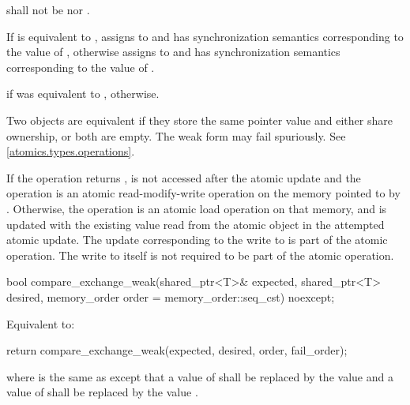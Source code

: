 \begin{itemdescr}
\pnum
\requires
{} shall not be
 nor .

\pnum
\effects
If  is equivalent to ,
assigns  to  and
has synchronization semantics corresponding to the value of ,
otherwise assigns  to  and
has synchronization semantics corresponding to the value of .

\pnum
\returns
{} if  was equivalent to ,
 otherwise.

\pnum
\remarks
Two  objects are equivalent if
they store the same pointer value and
either share ownership, or both are empty.
The weak form may fail spuriously. See \ref{atomics.types.operations}.

\pnum
If the operation returns ,
 is not accessed after the atomic update and
the operation is an atomic read-modify-write operation
on the memory pointed to by .
Otherwise, the operation is an atomic load operation on that memory, and
 is updated with the existing value
read from the atomic object in the attempted atomic update.
The  update corresponding to the write to 
is part of the atomic operation.
The write to  itself
is not required to be part of the atomic operation.
\end{itemdescr}

%
\begin{itemdecl}
bool compare_exchange_weak(shared_ptr<T>& expected, shared_ptr<T> desired,
                           memory_order order = memory_order::seq_cst) noexcept;
\end{itemdecl}

\begin{itemdescr}
\pnum
\effects
Equivalent to:
\begin{codeblock}
return compare_exchange_weak(expected, desired, order, fail_order);
\end{codeblock}
where  is the same as 
except that a value of 
shall be replaced by the value  and
a value of 
shall be replaced by the value .
\end{itemdescr}

